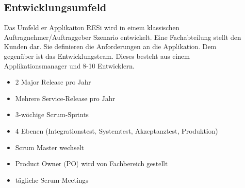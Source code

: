 \subsection{Entwicklungsumfeld}
Das Umfeld er Applikaiton RESi wird in einem klassischen  Auftragnehmer/Auftraggeber Szenario entwickelt. Eine Fachabteilung stellt den Kunden dar. Sie definieren die Anforderungen an die Applikation. Dem gegenüber ist das Entwicklungsteam. Dieses besteht aus einem Applikationsmanager und 8-10 Entwicklern. 

\begin{itemize}
\item 2 Major Release pro Jahr
\item Mehrere Service-Release pro Jahr
\item 3-wöchige Scrum-Sprints
\item 4 Ebenen (Integrationstest, Systemtest, Akzeptanztest, Produktion)
\item Scrum Master wechselt
\item Product Owner (PO) wird von Fachbereich gestellt
\item tägliche Scrum-Meetings
\end{itemize} 

